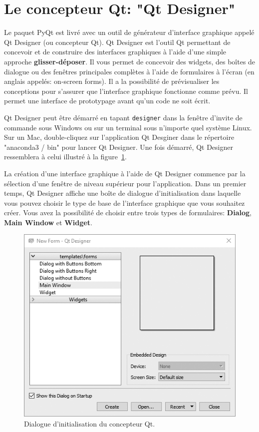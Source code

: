 \documentclass[%
oneside,                 %
final,                   %
10pt,french]{article}
\begin{document}
\section{Le concepteur Qt: "Qt Designer"}
Le paquet PyQt est livré avec un outil de générateur d'interface graphique appelé Qt Designer (ou concepteur Qt). Qt Designer est l’outil Qt permettant de concevoir et de construire des interfaces graphiques à l’aide d’une simple approche \textbf{glisser-déposer}. Il vous permet de concevoir des widgets, des boîtes de dialogue ou des fenêtres principales complètes à l'aide de formulaires à l'écran (en anglais appelés: on-screen forms). Il a la possibilité de prévisualiser les conceptions pour s'assurer que l'interface graphique fonctionne comme prévu. Il permet une interface de prototypage avant qu’un code ne soit écrit.

Qt Designer peut être démarré en tapant \texttt{designer} dans la fenêtre d'invite de commande sous Windows ou sur un terminal sous n'importe quel système Linux. Sur un Mac, double-cliquez sur l'application Qt Desginer dans le répertoire "anaconda3 / bin" pour lancer Qt Designer. Une fois démarré, Qt Designer ressemblera à celui illustré à la figure~\ref{fig:designerNew}.

La création d’une interface graphique à l’aide de Qt Designer commence par la sélection d’une fenêtre de niveau supérieur pour l’application. Dans un premier temps, Qt Designer affiche une boîte de dialogue d’initialisation dans laquelle vous pouvez choisir le type de base de l’interface graphique que vous souhaitez créer. Vous avez la possibilité de choisir entre trois types de formulaires: \textbf{Dialog}, \textbf{Main Window} et \textbf{Widget}.


\begin{figure}[!ht]  %
  \centerline{\includegraphics[width=0.7\linewidth]{imgs/designerNew.png}}
  \caption{
  Dialogue d'initialisation du concepteur Qt. \label{fig:designerNew}
  }
\end{figure}
\end{document}
